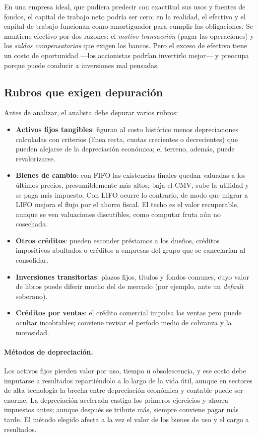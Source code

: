En una empresa ideal, que pudiera predecir con exactitud sus usos y fuentes de fondos, el capital de trabajo neto podría ser cero; en la realidad, el efectivo y el capital de trabajo funcionan como amortiguador para cumplir las obligaciones. Se mantiene efectivo por dos razones: el \emph{motivo transacción} (pagar las operaciones) y los \emph{saldos compensatorios} que exigen los bancos. Pero el exceso de efectivo tiene un costo de oportunidad —los accionistas podrían invertirlo mejor— y preocupa porque puede conducir a inversiones mal pensadas.

\subsection{Rubros que exigen depuración}

Antes de analizar, el analista debe depurar varios rubros:
\begin{itemize}
\item \textbf{Activos fijos tangibles}: figuran al costo histórico menos depreciaciones calculadas con criterios (línea recta, cuotas crecientes o decrecientes) que pueden alejarse de la depreciación económica; el terreno, además, puede revalorizarse.
\item \textbf{Bienes de cambio}: con FIFO las existencias finales quedan valuadas a los últimos precios, presumiblemente más altos; baja el CMV, sube la utilidad y se paga más impuesto. Con LIFO ocurre lo contrario, de modo que migrar a LIFO mejora el flujo por el ahorro fiscal. El techo es el valor recuperable, aunque se ven valuaciones discutibles, como computar fruta aún no cosechada.
\item \textbf{Otros créditos}: pueden esconder préstamos a los dueños, créditos impositivos abultados o créditos a empresas del grupo que se cancelarían al consolidar.
\item \textbf{Inversiones transitorias}: plazos fijos, títulos y fondos comunes, cuyo valor de libros puede diferir mucho del de mercado (por ejemplo, ante un \emph{default} soberano).
\item \textbf{Créditos por ventas}: el crédito comercial impulsa las ventas pero puede ocultar incobrables; conviene revisar el período medio de cobranza y la morosidad.
\end{itemize}

\paragraph{Métodos de depreciación.} Los activos fijos pierden valor por uso, tiempo u obsolescencia, y ese costo debe imputarse a resultados repartiéndolo a lo largo de la vida útil, aunque en sectores de alta tecnología la brecha entre depreciación económica y contable puede ser enorme. La depreciación acelerada castiga los primeros ejercicios y ahorra impuestos antes; aunque después se tribute más, siempre conviene pagar más tarde. El método elegido afecta a la vez el valor de los bienes de uso y el cargo a resultados.

